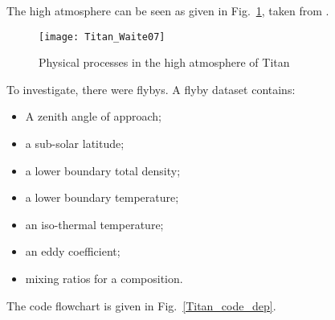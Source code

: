 The high atmosphere can be seen
as given in Fig.~\ref{Titan_high_atm}, taken
from \cite{Waite07}.

\begin{figure}
\centering
\texttt{[image: Titan\_Waite07]}
\caption{\label{Titan_high_atm}Physical processes in the high
atmosphere of Titan}
\end{figure}

To investigate, there were flybys. A flyby dataset contains:
\begin{itemize}
\item A zenith angle of approach;
\item a sub-solar latitude;
\item a lower boundary total density;
\item a lower boundary temperature;
\item an iso-thermal temperature;
\item an eddy coefficient;
\item mixing ratios for a composition.
\end{itemize}

The code flowchart is given in Fig.~\ref{Titan_code_dep}.

